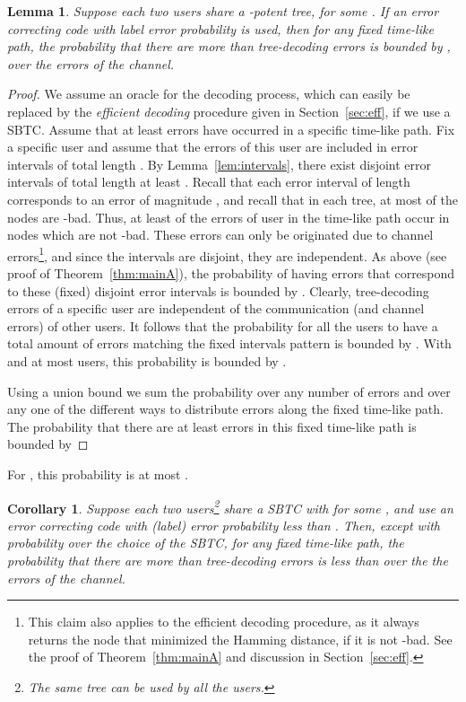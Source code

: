\documentclass[ letterpaper, 11pt]{article}
\newtheorem{lemma}[theorem]{Lemma}
\newtheorem{corollary}[theorem]{Corollary}
\newcommand{\potent}{potent\xspace}
\newcommand{\KTC}{\textsf{SBTC}\xspace}
\begin{document}
\begin{lemma}\label{lem:raja}
Suppose each two users share a -\potent tree, for some
 . If an error correcting code with  label error probability  is used,
then for any fixed  time-like path, the probability that there are more than
 tree-decoding errors
is bounded by ,
over the errors of the channel.
\end{lemma}
\begin{proof}
We assume an oracle for the decoding process, which can easily be replaced
by the \emph{efficient decoding} procedure
given in Section~\ref{sec:eff}, if we use a \KTC.
Assume that at least  errors have occurred in a specific  time-like path.
Fix a specific user  and assume that the errors of this user
are included in error intervals of total length .
By Lemma~\ref{lem:intervals}, there exist disjoint error intervals of total length at least .
Recall that each error interval of length  corresponds to an error of magnitude ,
and recall that in each tree, at most  of the nodes are -bad.
Thus, at least  of the errors of user  in the  time-like path
occur in nodes which are not -bad.
These errors can only be originated due to channel errors\footnote{This claim also applies
    to the efficient decoding procedure, as it
    always returns the node that minimized the Hamming distance,
    if it is not -bad.
    See the proof of Theorem~\ref{thm:mainA}
    and discussion in Section~\ref{sec:eff}.},
and since the intervals are disjoint, they are independent.
As above (see proof of Theorem~\ref{thm:mainA}),
the probability of having errors that correspond to these (fixed) disjoint error intervals
is bounded by .
Clearly, tree-decoding errors of a specific user are independent
of the communication (and channel errors) of other users.
It follows that the probability for all the users to have
a total amount of 
errors matching the fixed intervals pattern is bounded by
.
With  and at most  users,
this probability is bounded by .


Using a union bound we sum the probability over any number  of errors  and
over any one of the  
different ways to distribute  errors along the fixed time-like path.
The probability that there are at least 
errors in this fixed  time-like path is bounded by

\end{proof}
\noindent For  ,
this probability is at most .
\begin{corollary}
Suppose each two users\footnote{The same tree can be used by all the users.} share a \KTC
with  for some ,
and use an error correcting code with
(label) error probability less than .
Then, except with probability  over the choice of the \KTC,
for any fixed  time-like path,
the probability that there are more than  tree-decoding errors
is less than 
over the the errors of the channel.
\end{corollary}
\end{document}
